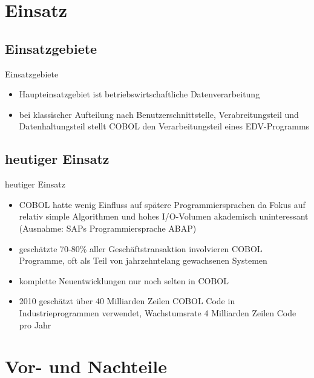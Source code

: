 \documentclass[handout]{beamer}
\begin{document}
\section{Einsatz}
\subsection{Einsatzgebiete}
\begin{frame}{Einsatzgebiete}
	\begin{itemize}[<+->]
		\item
			Haupteinsatzgebiet ist betriebswirtschaftliche Datenverarbeitung
		\item
			bei klassischer Aufteilung nach Benutzerschnittstelle, Verabreitungsteil und Datenhaltungsteil stellt COBOL den Verarbeitungsteil eines EDV-Programms
	\end{itemize}
\end{frame}


\subsection{heutiger Einsatz}
\begin{frame}{heutiger Einsatz}
	\begin{itemize}[<+->]
		\item
			COBOL hatte wenig Einfluss auf sp\"atere Programmiersprachen da Fokus auf relativ simple Algorithmen und hohes I/O-Volumen akademisch uninteressant (Ausnahme: SAPs Programmiersprache ABAP)
		\item
			geschätzte 70-80\% aller Geschäftstransaktion involvieren COBOL Programme, oft als Teil von jahrzehntelang gewachsenen Systemen
		\item
			komplette Neuentwicklungen nur noch selten in COBOL
		\item
			2010 geschätzt \"uber 40 Milliarden Zeilen COBOL Code in Industrieprogrammen verwendet, Wachstumsrate 4 Milliarden Zeilen Code pro Jahr
	\end{itemize}
\end{frame}


\section{Vor- und Nachteile}
\end{document}
